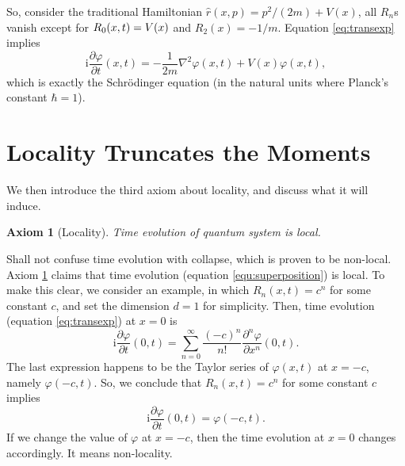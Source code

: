 \documentclass{book}
\newcommand{\mathi}{\mathrm{i}}
\newtheorem{axiom}{Axiom}
\begin{document}
So, consider the traditional Hamiltonian $\hat{r}  (x, p) = p^2 / (2 m) + V
(x)$, all $R_n$s vanish except for ${\color[HTML]{000000}R_0  (x, t)} = V (x)$
and $R_2 (x) = - 1 / m$. Equation \ref{eq:transexp} implies
\begin{equation}
  \mathi \frac{\partial \varphi}{\partial t}  (x, t) = - \frac{1}{2 m}
  \nabla^2 \varphi (x, t) + V (x) \varphi (x, t),
\end{equation}
which is exactly the Schrödinger equation (in the natural units where
Planck's constant $\hbar = 1$).

\section{Locality Truncates the Moments}\label{section:Locality Truncates the
Moments}

We then introduce the third axiom about locality, and discuss what it will
induce.

\begin{axiom}[Locality]
  \label{axiom:local}Time evolution of quantum system is local.
\end{axiom}

Shall not confuse time evolution with collapse, which is proven to be
non-local. Axiom \ref{axiom:local} claims that time evolution (equation
\ref{equ:superposition}) is local. To make this clear, we consider an example,
in which $R_n  (x, t) = c^n$ for some constant $c$, and set the dimension $d =
1$ for simplicity. Then, time evolution (equation \ref{eq:transexp}) at $x =
0$ is
\[ \mathi \frac{\partial \varphi}{\partial t}  (0, t) = \sum_{n = 0}^{\infty}
   \frac{(- c)^n}{n!}  \frac{\partial^n \varphi}{\partial x^n}  (0, t) . \]
The last expression happens to be the Taylor series of $\varphi (x, t)$ at $x
= - c$, namely $\varphi (- c, t)$. So, we conclude that $R_n  (x, t) = c^n$
for some constant $c$ implies
\[ \mathi \frac{\partial \varphi}{\partial t}  (0, t) = \varphi (- c, t) . \]
If we change the value of $\varphi$ at $x = - c$, then the time evolution at
$x = 0$ changes accordingly. It means non-locality.
\end{document}
